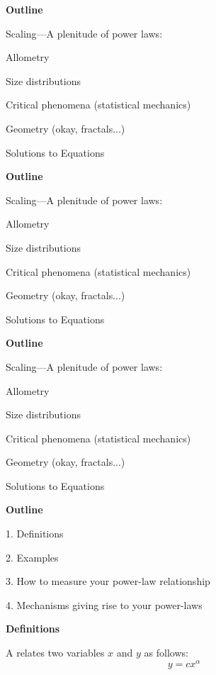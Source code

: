   \textbf{Outline}

  {Scaling---A plenitude of power laws:}

   Allometry

   Size distributions

   Critical phenomena {\small (statistical mechanics)}

  \inv

   Geometry {\small (okay, fractals...)}


   Solutions to Equations


  \textbf{Outline}

  {Scaling---A plenitude of power laws:}

   Allometry

   Size distributions

   Critical phenomena {\small (statistical mechanics)}

   Geometry {\small (okay, fractals...)}

  \inv

   Solutions to Equations


  \textbf{Outline}

  {Scaling---A plenitude of power laws:}

   Allometry

   Size distributions

   Critical phenomena {\small (statistical mechanics)}

   Geometry {\small (okay, fractals...)}

   Solutions to Equations


  \textbf{Outline}


1. Definitions

2. Examples

3. How to measure your power-law relationship

4. Mechanisms giving rise to your power-laws 



  \textbf{Definitions}

A  relates two
variables $x$ and $y$ as follows:
{\Large
$$ y = c x^\alpha $$
}

\inv

